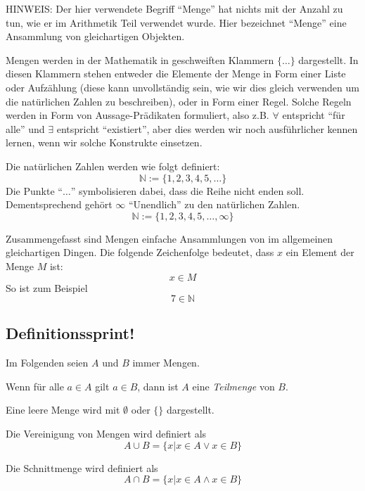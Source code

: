 \begin{svgraybox}
HINWEIS: Der hier verwendete Begriff "`Menge"' hat nichts mit der Anzahl zu tun, wie er im Arithmetik Teil verwendet wurde. Hier bezeichnet "`Menge"' eine Ansammlung von gleichartigen Objekten.
\end{svgraybox}

Mengen werden in der Mathematik in geschweiften Klammern $\{\dots \}$ dargestellt. In diesen Klammern stehen entweder die Elemente der Menge in Form einer Liste oder Aufzählung (diese kann unvollständig sein, wie wir dies gleich verwenden um die natürlichen Zahlen zu beschreiben), oder in Form einer Regel. Solche Regeln werden in Form von Aussage-Prädikaten formuliert, also z.B. $\forall$ entspricht "`für alle"' und $\exists$ entspricht "`existiert"', aber dies werden wir noch ausführlicher kennen lernen, wenn wir solche Konstrukte einsetzen. 

Die natürlichen Zahlen werden wie folgt definiert:
\[\mathbb{N} := \{ 1,2,3,4,5, \dots \} \]
Die Punkte "`$\dots$"' symbolisieren dabei, dass die Reihe nicht enden soll. Dementsprechend gehört $\infty$ "`Unendlich"' zu den natürlichen Zahlen.
\[\mathbb{N} := \{ 1,2,3,4,5, \dots, \infty \} \]

Zusammengefasst sind Mengen einfache Ansammlungen von im allgemeinen gleichartigen Dingen. Die folgende Zeichenfolge bedeutet, dass $x$ ein Element der Menge $M$ ist:
\[x \in M \]
So ist zum Beispiel
\[7 \in \mathbb{N} \]

\subsection{Definitionssprint!}
Im Folgenden seien $A$ und $B$ immer Mengen.

\begin{definition}
Wenn für alle $a\in A$ gilt $a\in B$, dann ist $A$ eine \textsl{Teilmenge} von $B$.
\end{definition}

\begin{definition}
Eine leere Menge wird mit $\emptyset$ oder $\{\}$ dargestellt.
\end{definition}

\begin{definition}
Die Vereinigung von Mengen wird definiert als
\[A \cup B = \{ x | x\in A \vee x\in B \}\]
\end{definition}

\begin{definition}
Die Schnittmenge wird definiert als 
\[A \cap B = \{x| x\in A \wedge x\in B \} \]
\end{definition}

